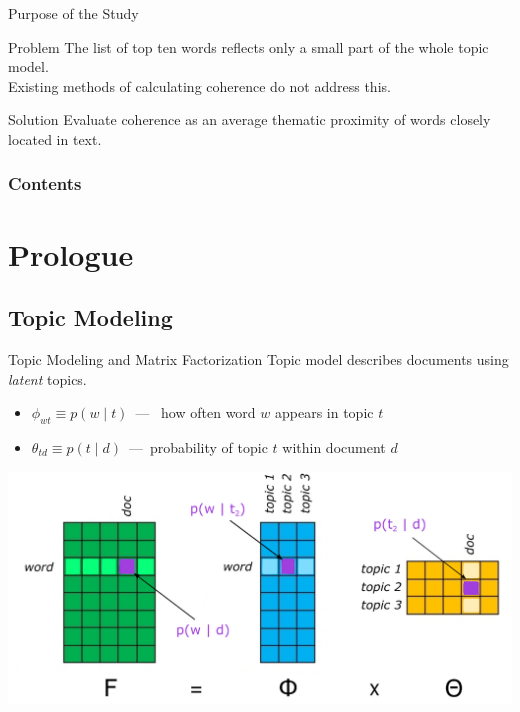 \documentclass[russian]{beamer}
\begin{document}
\begin{frame}{Purpose of the Study}
  \begin{block}{Problem}
    The list of top ten words reflects only a small part of the whole topic model. \\
    Existing methods of calculating coherence do not address this.
  \end{block}
  \begin{block}{Solution}
    Evaluate coherence as an average thematic proximity of words closely located in text.
  \end{block}
\end{frame}


\begin{frame}
  \frametitle{Contents}
  \tableofcontents
\end{frame}


\section{Prologue}


\subsection{Topic Modeling}


\begin{frame}{Topic Modeling and Matrix Factorization}
  Topic model describes documents using \emph{latent} topics.
  \begin{itemize}
    \item $\phi_{wt} \equiv p(w \mid t)$~---~ how often word $w$ appears in topic $t$
    \item $\theta_{td} \equiv p(t \mid d)$~---~probability of topic $t$ within document $d$
  \end{itemize}
  \centering
  \includegraphics[width=\textwidth]{murat_plsa.eps}\\

\end{frame}
\end{document}
